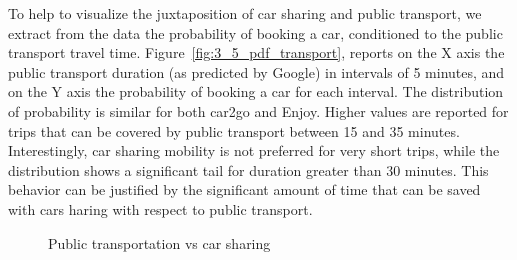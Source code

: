 
To help to visualize the juxtaposition of car sharing and public transport, we extract from the data the probability of booking a car, conditioned to the public transport travel time. Figure~\ref{fig:3_5_pdf_transport}, reports on the X axis the public transport duration (as predicted by Google) in intervals of 5 minutes, and on the Y axis the probability of booking a car for each interval.
The distribution of probability is similar for both car2go and Enjoy. Higher values are reported for trips that can be covered by public transport between 15 and 35 minutes. Interestingly, car sharing mobility is not preferred for very short trips, while the distribution shows a significant tail for duration greater than 30 minutes. This behavior can be justified by the significant amount of time that can be saved with cars haring with respect to public transport.

  
  \begin{figure}[t!]
  \centering     %
  \caption{Public transportation vs car sharing \label{fig:3_5_public_transport}}
  \end{figure}
  
